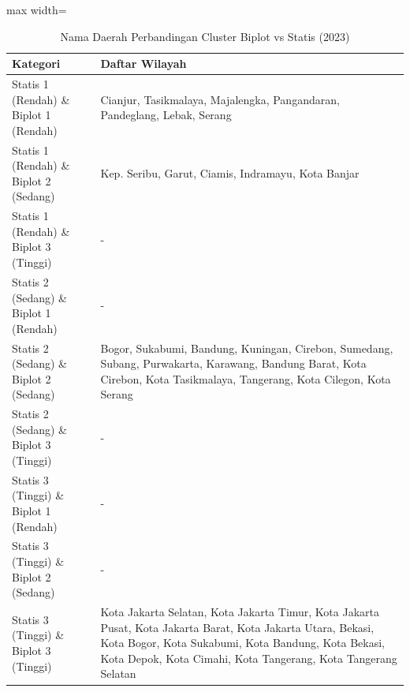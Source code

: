 \begin{table}[H]
\centering
\caption{Nama Daerah Perbandingan Cluster Biplot vs Statis (2023)} \label{tab:appbiplot_statis_name_2023}
\begin{adjustbox}{max width=\textwidth}
\begin{tabular}{|p{4cm}|p{10cm}|}
\hline
\textbf{Kategori} & \textbf{Daftar Wilayah} \\
\hline
Statis 1 (Rendah) \& Biplot 1 (Rendah) & Cianjur, Tasikmalaya, Majalengka, Pangandaran, Pandeglang, Lebak, Serang \\
\hline
Statis 1 (Rendah) \& Biplot 2 (Sedang) & Kep. Seribu, Garut, Ciamis, Indramayu, Kota Banjar \\
\hline
Statis 1 (Rendah) \& Biplot 3 (Tinggi) & - \\
\hline
Statis 2 (Sedang) \& Biplot 1 (Rendah) & - \\
\hline
Statis 2 (Sedang) \& Biplot 2 (Sedang) & Bogor, Sukabumi, Bandung, Kuningan, Cirebon, Sumedang, Subang, Purwakarta, Karawang, Bandung Barat, Kota Cirebon, Kota Tasikmalaya, Tangerang, Kota Cilegon, Kota Serang \\
\hline
Statis 2 (Sedang) \& Biplot 3 (Tinggi) & - \\
\hline
Statis 3 (Tinggi) \& Biplot 1 (Rendah) & - \\
\hline
Statis 3 (Tinggi) \& Biplot 2 (Sedang) & - \\
\hline
Statis 3 (Tinggi) \& Biplot 3 (Tinggi) & Kota Jakarta Selatan, Kota Jakarta Timur, Kota Jakarta Pusat, Kota Jakarta Barat, Kota Jakarta Utara, Bekasi, Kota Bogor, Kota Sukabumi, Kota Bandung, Kota Bekasi, Kota Depok, Kota Cimahi, Kota Tangerang, Kota Tangerang Selatan \\
\hline
\end{tabular}
\end{adjustbox}
\end{table}